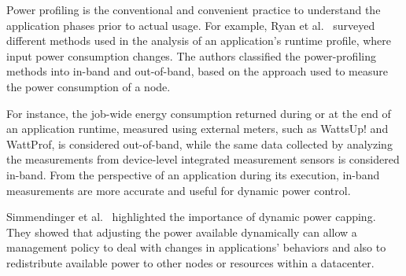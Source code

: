 Power profiling is the conventional and convenient practice to understand the application phases prior to actual usage. For example, Ryan et al.~\cite{8323587} surveyed different methods used in the analysis of an application's runtime profile, where input power consumption changes. The authors classified the power-profiling methods into in-band and out-of-band, based on the approach used to measure the power consumption of a node. 

For instance, the job-wide energy consumption returned during or at the end of an application runtime, measured using external meters, 
such as WattsUp! and WattProf, 
is considered out-of-band, while the same data collected by analyzing the measurements from device-level integrated measurement sensors is considered in-band. From the perspective of an application during its execution, in-band measurements are more accurate and useful for dynamic power control. 

Simmendinger et al.~\cite{10740868} highlighted the importance of dynamic power
capping. They showed that adjusting the power available dynamically can allow a management policy to deal with changes in applications' behaviors and also to redistribute
available power to other nodes or resources within a datacenter. 


